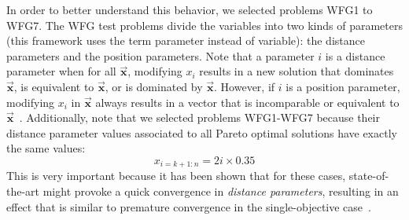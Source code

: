 

In order to better understand this behavior, we selected problems WFG1 to WFG7.
%
The WFG test problems divide the variables into two kinds of parameters (this framework uses the term parameter instead of 
variable): the distance parameters and the position parameters.
%
Note that a parameter $i$ is a distance parameter when for all $\vec{\mathbf{x}}$, modifying $x_i$ results in a new solution 
that dominates $\vec{\mathbf{x}}$, is equivalent to $\vec{\mathbf{x}}$, or is dominated by $\vec{\mathbf{x}}$.
%
However, if $i$ is a position parameter, modifying $x_i$ in $\vec{\mathbf{x}}$ always results in a vector that is incomparable or 
equivalent to $\vec{\mathbf{x}}$~\citep{huband2005scalable}.
%
Additionally, note that we selected problems WFG1-WFG7 because their distance parameter values associated to all Pareto optimal solutions 
have exactly the same values:
%
\begin{equation}
   x_{i=k+1:n} = 2i \times 0.35
\end{equation}
%
This is very important because it has been shown that for these cases, state-of-the-art
\MOEAS{} might provoke a quick convergence in \textit{distance parameters}, resulting in an effect that is similar to 
premature convergence in the single-objective case~\citep{Joel:GDE3_CEC09,castillo2017multi}.

